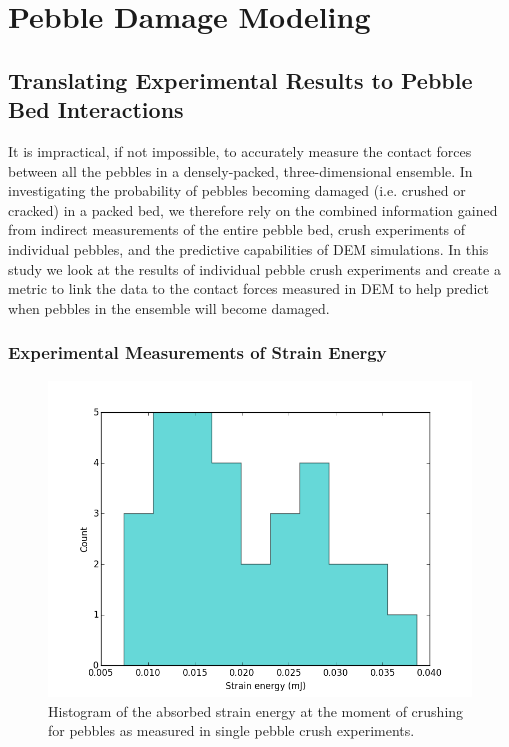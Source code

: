 \section{Pebble Damage Modeling}\label{sec:failure-study}

\subsection{Translating Experimental Results to Pebble Bed Interactions}\label{sec:theoryStrainEnergy}

It is impractical, if not impossible, to accurately measure the contact forces between all the pebbles in a densely-packed, three-dimensional ensemble. In investigating the probability of pebbles becoming damaged (i.e. crushed or cracked) in a packed bed, we therefore rely on the combined information gained from indirect measurements of the entire pebble bed, crush experiments of individual pebbles, and the predictive capabilities of DEM simulations. In this study we look at the results of individual pebble crush experiments and create a metric to link the data to the contact forces measured in DEM to help predict when pebbles in the ensemble will become damaged.

\subsubsection{Experimental Measurements of Strain Energy}
\begin{figure}[!t]
\centering
    \includegraphics[width=\doubleimagewidth]{chapters/figures/fzk-w-histogram.png}
    \caption{Histogram of the absorbed strain energy at the moment of crushing for \lis pebbles as measured in single pebble crush experiments.}
    \label{fig:fzk-w-hist}
\end{figure}

